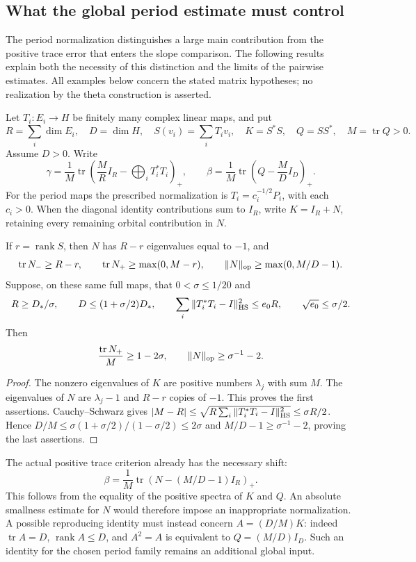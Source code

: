 \subsection{What the global period estimate must control}
\label{shared-period-comparison-limits}

The period normalization distinguishes a large main contribution from
the positive trace error that enters the slope comparison. The following
results explain both the necessity of this distinction and the limits
of the pairwise estimates. All examples below concern the stated matrix
hypotheses; no realization by the theta construction is asserted.

Let $T_i:E_i\to H$ be finitely many complex linear maps, and put
\[
 R=\sum_i\dim E_i,\quad D=\dim H,\quad
 S(v_i)=\sum_iT_iv_i,\quad K=S^*S,\quad Q=SS^*,\quad M=\operatorname{tr}Q>0.
\]
Assume $D>0$. Write
\[
 \gamma=\frac1M\operatorname{tr}
   \left(\frac MR I_R-\bigoplus_iT_i^*T_i\right)_+,\qquad
 \beta=\frac1M\operatorname{tr}\left(Q-\frac MD I_D\right)_+.
\]
For the period maps the prescribed normalization is $T_i=c_i^{-1/2}P_i$,
with each $c_i>0$. When the diagonal identity contributions sum to $I_R$,
write $K=I_R+N$, retaining every remaining orbital contribution in $N$.

\begin{proposition}
\label{shared-period-redundancy}
If $r=\operatorname{rank}S$, then $N$ has $R-r$ eigenvalues equal to $-1$,
and
\[
 \operatorname{tr}N_-\ge R-r,\qquad
 \operatorname{tr}N_+\ge\max(0,M-r),\qquad
 \|N\|_{\rm op}\ge\max(0,M/D-1).
\]
Suppose, on these same full maps, that $0<\sigma\le1/20$ and
\[
 R\ge D_*/\sigma,\qquad D\le(1+\sigma/2)D_*,
 \qquad \sum_i\|T_i^*T_i-I\|_{\rm HS}^2\le e_0R,
 \qquad\sqrt{e_0}\le\sigma/2.
\]
Then
\[
 \frac{\operatorname{tr}N_+}{M}\ge1-2\sigma,
                 \qquad \|N\|_{\rm op}\ge\sigma^{-1}-2.
\]
\end{proposition}

\begin{proof}
The nonzero eigenvalues of $K$ are positive numbers $\lambda_j$ with
sum $M$. The eigenvalues of $N$ are $\lambda_j-1$ and $R-r$ copies
of $-1$. This proves the first assertions. Cauchy--Schwarz gives
$|M-R|\le\sqrt{R\sum_i\|T_i^*T_i-I\|_{\rm HS}^2}\le\sigma R/2$.
Hence $D/M\le\sigma(1+\sigma/2)/(1-\sigma/2)\le2\sigma$ and
$M/D-1\ge\sigma^{-1}-2$, proving the last assertions.
\end{proof}

The actual positive trace criterion already has the necessary shift:
\[
 \beta=\frac1M\operatorname{tr}
             \left(N-(M/D-1)I_R\right)_+.
\]
This follows from the equality of the positive spectra of $K$ and $Q$.
An absolute smallness estimate for $N$ would therefore impose an
inappropriate normalization. A possible reproducing identity must instead
concern $A=(D/M)K$: indeed
$\operatorname{tr}A=D$, $\operatorname{rank}A\le D$, and
$A^2=A$ is equivalent to $Q=(M/D)I_D$. Such an identity for the chosen
period family remains an additional global input.


